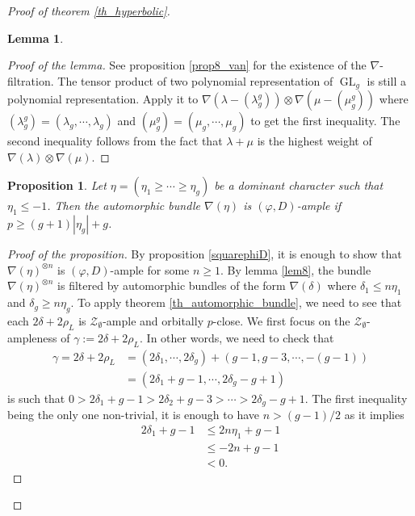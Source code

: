 \documentclass[11pt]{amsart}
\numberwithin{subsection}{section}
\numberwithin{figure}{section}
\numberwithin{table}{section}
\theoremstyle{1}
\newtheorem{lemma}[theorem]{Lemma}
\newtheorem{proposition}[theorem]{Proposition}
\theoremstyle{2}
\DeclareMathOperator{\GL}{GL}
\begin{document}
\begin{proof}[Proof of theorem \ref{th_hyperbolic}]
\begin{lemma}
\end{lemma}
\begin{proof}[Proof of the lemma]
See proposition \ref{prop8_van} for the existence of the $\nabla$-filtration. The tensor product of two polynomial representation of $\GL_g$ is still a polynomial representation. Apply it to $\nabla(\lambda-(\lambda_g^g)) \otimes \nabla(\mu-(\mu_g^g))$ where $(\lambda_g^g) = (\lambda_g, \cdots, \lambda_g)$ and $(\mu_g^g) = (\mu_g, \cdots, \mu_g)$ to get the first inequality. The second inequality follows from the fact that $\lambda + \mu$ is the highest weight of $\nabla(\lambda)\otimes \nabla(\mu)$.
\end{proof}
\begin{proposition}\label{prop_amp_bound}
Let $\eta = (\eta_1 \geq \cdots \geq \eta_g)$ be a dominant character such that $\eta_1 \leq -1$. Then the automorphic bundle $\nabla(\eta)$ is $(\varphi,D)$-ample if $p \geq (g+1)|\eta_g| + g$.
\end{proposition}
\begin{proof}[Proof of the proposition]
By proposition \ref{squarephiD}, it is enough to show that $\nabla(\eta)^{\otimes n}$ is $(\varphi,D)$-ample for some $n\geq 1$. By lemma \ref{lem8}, the bundle $\nabla(\eta)^{\otimes n}$ is filtered by automorphic bundles of the form $\nabla(\delta)$ where $\delta_1 \leq n\eta_1$ and $\delta_g \geq n\eta_g$. To apply theorem \ref{th_automorphic_bundle}, we need to see that each $2\delta + 2\rho_L$ is $\mathcal{Z}_{\emptyset}$-ample and orbitally $p$-close. We first focus on the $\mathcal{Z}_{\emptyset}$-ampleness of $\gamma := 2\delta + 2\rho_L$. In other words, we need to check that
\begin{equation*}
\begin{aligned}
\gamma = 2\delta + 2\rho_L &= (2\delta_1, \cdots, 2\delta_g) + (g-1,g-3,\cdots, -(g-1)) \\
&= (2\delta_1+g-1, \cdots, 2\delta_g-g+1)
\end{aligned}
\end{equation*}
is such that $0 > 2\delta_1+g-1 > 2\delta_2+g-3 > \cdots > 2\delta_g -g+1$. The first inequality being the only one non-trivial, it is enough to have $n > (g-1)/2$ as it implies
\begin{equation*}
\begin{aligned}
2\delta_1+g-1 &\leq 2n\eta_1+g-1  \\
&\leq -2n+g-1 \\
&< 0.
\end{aligned}
\end{equation*}

\end{proof}
\end{proof}
\end{document}
